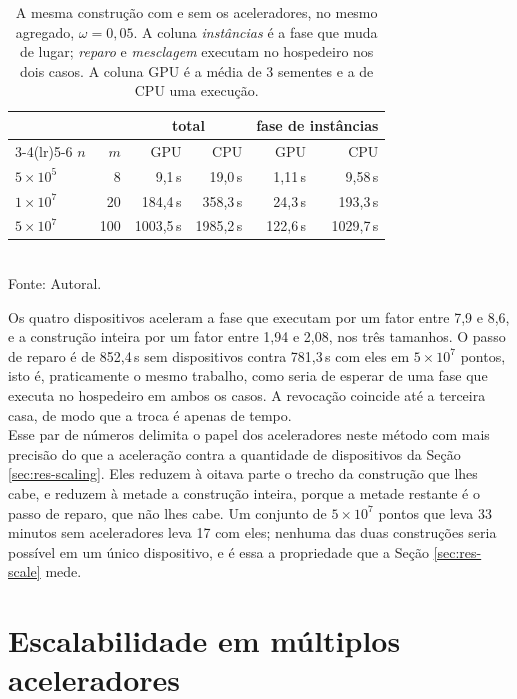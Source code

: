 \begin{table}[htb!]
\caption{\label{tab:cpuonly} A mesma construção com e sem os aceleradores, no mesmo agregado, $\omega = 0{,}05$. A coluna \textit{instâncias} é a fase que muda de lugar; \textit{reparo} e \textit{mesclagem} executam no hospedeiro nos dois casos. A coluna \ac{GPU} é a média de 3 sementes e a de \ac{CPU} uma execução.}
\centering
\footnotesize
\begin{tabular}{@{}lrrrrr@{}}
\toprule
 & & \multicolumn{2}{c}{total} & \multicolumn{2}{c}{fase de instâncias} \\
\cmidrule(lr){3-4}\cmidrule(lr){5-6}
$n$ & $m$ & \ac{GPU} & \ac{CPU} & \ac{GPU} & \ac{CPU} \\
\midrule
$5\times10^5$ & 8   & 9,1\,s     & 19,0\,s    & 1,11\,s   & 9,58\,s \\
$1\times10^7$ & 20  & 184,4\,s   & 358,3\,s   & 24,3\,s   & 193,3\,s \\
$5\times10^7$ & 100 & 1003,5\,s  & 1985,2\,s  & 122,6\,s  & 1029,7\,s \\
\bottomrule
\end{tabular}\\
Fonte: Autoral.
\end{table}

Os quatro dispositivos aceleram a fase que executam por um fator entre 7,9 e 8,6, e a construção inteira por um fator entre 1,94 e 2,08, nos três tamanhos. O passo de reparo é de 852,4\,s sem dispositivos contra 781,3\,s com eles em $5 \times 10^7$ pontos, isto é, praticamente o mesmo trabalho, como seria de esperar de uma fase que executa no hospedeiro em ambos os casos. A revocação coincide até a terceira casa, de modo que a troca é apenas de tempo.\\

Esse par de números delimita o papel dos aceleradores neste método com mais precisão do que a aceleração contra a quantidade de dispositivos da Seção \ref{sec:res-scaling}. Eles reduzem à oitava parte o trecho da construção que lhes cabe, e reduzem à metade a construção inteira, porque a metade restante é o passo de reparo, que não lhes cabe. Um conjunto de $5 \times 10^7$ pontos que leva 33 minutos sem aceleradores leva 17 com eles; nenhuma das duas construções seria possível em um único dispositivo, e é essa a propriedade que a Seção \ref{sec:res-scale} mede.\\

\section{Escalabilidade em múltiplos aceleradores\label{sec:res-scaling}}

